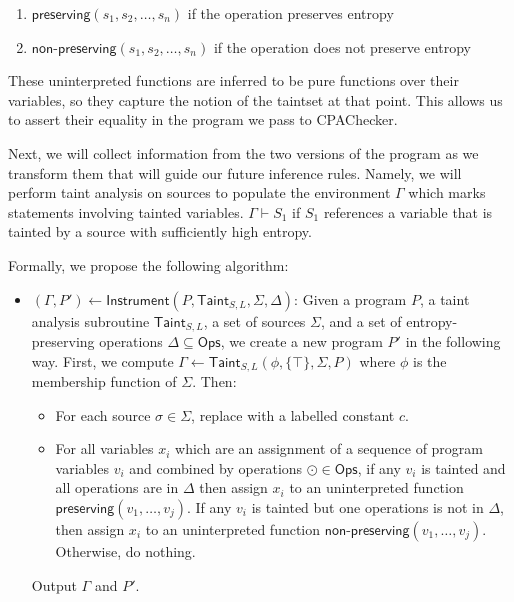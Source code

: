 \documentclass[letterpaper,twocolumn,10pt]{article}
\begin{document}
	\begin{enumerate}
		\item $\textsf{preserving}(s_1, s_2, \ldots, s_n)$ if the operation preserves entropy 
		\item $\textsf{non-preserving}(s_1, s_2, \ldots, s_n)$ if the operation does not preserve entropy 
	\end{enumerate}

	These uninterpreted functions are inferred to be pure functions over their variables, so they capture the notion of the taintset at that point. This allows us to assert their equality in the program we pass to CPAChecker. 

	Next, we will collect information from the two versions of the program as we transform them that will guide our future inference rules. Namely, we will perform taint analysis on sources to populate the environment $\Gamma$ which marks statements involving tainted variables. $\Gamma \vdash S_1$ if $S_1$ references a variable that is tainted by a source with sufficiently high entropy.  


Formally, we propose the following algorithm:

\begin{itemize}
    \item $(\Gamma, P') \gets \mathsf{Instrument}(P, \mathsf{Taint}_{S,L}, \Sigma, \Delta)$: Given a program $P$, a taint analysis subroutine $\mathsf{Taint}_{S,L}$, a set
    of sources $\Sigma$, and a set of entropy-preserving operations $\Delta \subseteq \mathsf{Ops}$, we create a new program $P'$ in the following way. First,
    we compute $\Gamma \gets \mathsf{Taint}_{S,L}(\phi, \{\top\}, \Sigma, P)$ where $\phi$ is the membership function of $\Sigma$. Then:
    \begin{itemize}
        \item For each source $\sigma \in \Sigma$, replace with a labelled constant $c$.
        \item For all variables $x_i$ which are an assignment of a sequence of program variables $v_i$ and combined by operations $\odot \in \mathsf{Ops}$,
        if any $v_i$ is tainted and all operations are in $\Delta$ then assign $x_i$ to an uninterpreted function $\textsf{preserving}(v_1, \ldots, v_j)$. If
        any $v_i$ is tainted but one operations is not in $\Delta$, then assign $x_i$ to an uninterpreted function $\textsf{non-preserving}(v_1, \ldots, v_j)$.
        Otherwise, do nothing.
    \end{itemize}
    Output $\Gamma$ and $P'$.
\end{itemize}
\end{document}
